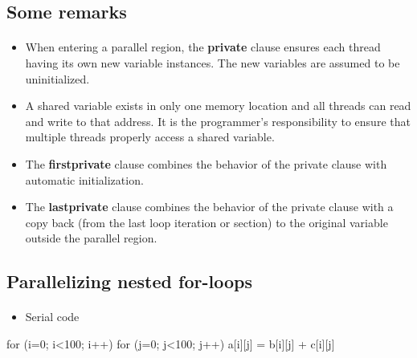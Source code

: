 \documentclass[%
twoside,                 %
final,                   %
10pt]{article}
\begin{document}
\noindent




\subsection{Some remarks}

\paragraph{}

\begin{itemize}
\item When entering a parallel region, the \textbf{private} clause ensures each thread having its own new variable instances. The new variables are assumed to be uninitialized.

\item A shared variable exists in only one memory location and all threads can read and write to that address. It is the programmer's responsibility to ensure that multiple threads properly access a shared variable.

\item The \textbf{firstprivate} clause combines the behavior of the private clause with automatic initialization.

\item The \textbf{lastprivate} clause combines the behavior of the private clause with a copy back (from the last loop iteration or section) to the original variable outside the parallel region.
\end{itemize}

\noindent




\subsection{Parallelizing nested for-loops}

\paragraph{}

\begin{itemize}
 \item Serial code
\end{itemize}

\noindent
\bcppcod
for (i=0; i<100; i++)
for (j=0; j<100; j++)
a[i][j] = b[i][j] + c[i][j]
\ecppcod
\end{document}
